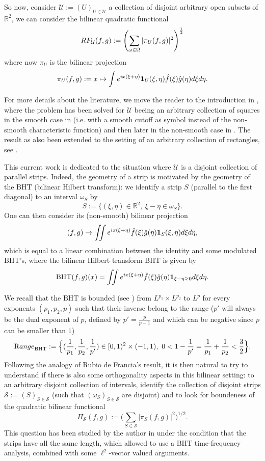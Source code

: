 \documentclass[a4paper,11pt,oneside]{amsart}
\newcommand{\BHT}{{\textrm{BHT}}}
\theoremstyle{plain}
\theoremstyle{definition}
\begin{document}
So now, consider ${\mathcal U}:=(U)_{U\in{\mathcal U}}$ a collection of disjoint arbitrary open subsets of ${\mathbb R}^2$, we can consider the bilinear quadratic functional 
$$ RF_{{\mathcal U}}(f,g):= \left(\sum_{\omega \in \Omega} |\pi_{U}(f,g)|^2 \right)^{1\over 2}$$
where now $\pi_{U}$ is the bilinear projection
$$ \pi_{U}(f,g):= x \mapsto \int e^{ix(\xi+\eta)} {\bf 1}_{U}(\xi,\eta) \hat{f}(\xi) \hat{g}(\eta) d\xi d\eta.$$

For more details about the literature, we move the reader to the introduction in \cite{BB}, where the problem has been solved for ${\mathcal U}$ beeing an arbitrary collection of squares in the smooth case in \cite{BB} (i.e. with a smooth cutoff as symbol instead of the non-smooth characteristic function) and then later in the non-smooth case in \cite{BV1}. The result as also been extended to the setting of an arbitrary collection of rectangles, see \cite{BV2}. 

This current work is dedicated to the situation where ${\mathcal U}$ is a disjoint collection of parallel strips. Indeed, the geometry of a strip is motivated by the geometry of the $\BHT$ (bilinear Hilbert transform): we identify a strip $S$ (parallel to the first diagonal) to an interval $\omega_{S}$ by
$$ S:=\{(\xi,\eta)\in{\mathbb R}^2,\ \xi-\eta \in \omega_{S}\}.$$
One can then consider its (non-smooth) bilinear projection
$$ (f,g) \rightarrow \iint e^{ix(\xi+\eta)} \hat{f}(\xi) \hat{g}(\eta) {\bf 1}_{S}(\xi,\eta)d\xi d\eta,$$
which is equal to a linear combination between the identity and some modulated $\BHT$'s,
where the bilinear Hilbert transform $\BHT$ is given by
$$ \BHT(f,g)(x) = \iint e^{ix(\xi+\eta)} \hat{f}(\xi) \hat{g}(\eta) {\bf 1}_{\xi-\eta\geq 0} d\xi d\eta.$$

We recall that the $\BHT$ is bounded (see \cite{LT1,LT2}) from $L^{p_1} \times L^{p_2}$ to $L^{p}$ for every exponents $(p_1,p_2,p)$ such that their inverse belong to the range ($p'$ will always be the dual exponent of $p$, defined by $p'=\frac{p}{p-1}$ and which can be negative since $p$ can be smaller than $1$)
$${\textrm Range}_{\BHT}:=\Big\{(\frac{1}{p_1},\frac{1}{p_2},\frac{1}{p'})\in [0,1)^2 \times (-1,1),\ 0<1-\frac{1}{p'}=\frac{1}{p_1}+\frac{1}{p_2}<\frac{3}{2}\Big\}.$$
Following the analogy of Rubio de Francia's result, it is then natural to try to understand if there is also some orthogonality aspects in this bilinear setting: to an arbitrary disjoint collection of intervals, identify the collection of disjoint strips ${\mathcal S}:=(S)_{S\in{\mathcal S}}$ (such that $(\omega_S)_{S\in{\mathcal S}}$ are disjoint) and to look for boundeness of the quadratic bilinear functional 
$$ \Pi_{\mathcal S}(f,g) := \Big( \sum_{S\in{\mathcal S}} |\pi_S(f,g)|^2 \Big)^{1/2}.$$
This question has been studied by the author in \cite{B} under the condition that the strips have all the same length, which allowed to use a $\BHT$ time-frequency analysis, combined with some $\ell^2$-vector valued arguments.
\end{document}

